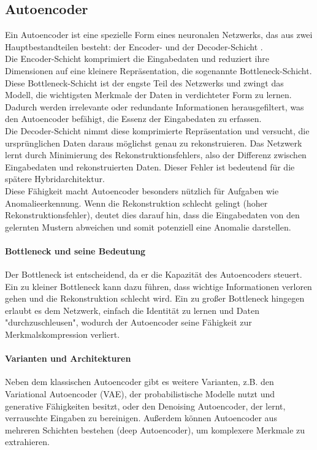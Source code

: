 \documentclass[a4paper,12pt]{article}
\begin{document}
	\subsection{Autoencoder}
	Ein Autoencoder ist eine spezielle Form eines neuronalen Netzwerks, das aus zwei Hauptbestandteilen besteht: der Encoder- und der Decoder-Schicht \cite{michelucci2022introduction}.
	\\[0.5em]
	Die Encoder-Schicht komprimiert die Eingabedaten und reduziert ihre Dimensionen auf eine kleinere Repräsentation, die sogenannte Bottleneck-Schicht. Diese Bottleneck-Schicht ist der engste Teil des Netzwerks und zwingt das Modell, die wichtigsten Merkmale der Daten in verdichteter Form zu lernen. Dadurch werden irrelevante oder redundante Informationen herausgefiltert, was den Autoencoder befähigt, die Essenz der Eingabedaten zu erfassen.
	\\[0.5em]
	Die Decoder-Schicht nimmt diese komprimierte Repräsentation und versucht, die ursprünglichen Daten daraus möglichst genau zu rekonstruieren. Das Netzwerk lernt durch Minimierung des Rekonstruktionsfehlers, also der Differenz zwischen Eingabedaten und rekonstruierten Daten. Dieser Fehler ist bedeutend für die spätere Hybridarchitektur.
	\\[0.5em]
	Diese Fähigkeit macht Autoencoder besonders nützlich für Aufgaben wie Anomalieerkennung. Wenn die Rekonstruktion schlecht gelingt (hoher Rekonstruktionsfehler), deutet dies darauf hin, dass die Eingabedaten von den gelernten Mustern abweichen und somit potenziell eine Anomalie darstellen.
	
	\paragraph{Bottleneck und seine Bedeutung}
	Der Bottleneck ist entscheidend, da er die Kapazität des Autoencoders steuert. Ein zu kleiner Bottleneck kann dazu führen, dass wichtige Informationen verloren gehen und die Rekonstruktion schlecht wird. Ein zu großer Bottleneck hingegen erlaubt es dem Netzwerk, einfach die Identität zu lernen und Daten "durchzuschleusen", wodurch der Autoencoder seine Fähigkeit zur Merkmalskompression verliert.
	
	\paragraph{Varianten und Architekturen}
	Neben dem klassischen Autoencoder gibt es weitere Varianten, z.B. den Variational Autoencoder (VAE), der probabilistische Modelle nutzt und generative Fähigkeiten besitzt, oder den Denoising Autoencoder, der lernt, verrauschte Eingaben zu bereinigen. Außerdem können Autoencoder aus mehreren Schichten bestehen (deep Autoencoder), um komplexere Merkmale zu extrahieren.
	
\end{document}
